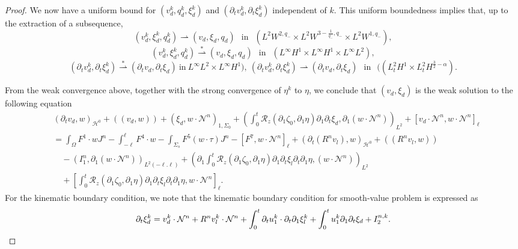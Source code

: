 \documentclass[letterpaper,reqno,10pt,twoside]{amsart}
\theoremstyle{definition}
\theoremstyle{remark}
\def\p{\partial}
\def\Om{\Omega}
\begin{document}
\begin{proof}
		We now have a uniform bound for $(v^{k}_{d},q^{k}_{d},\xi^{k}_{d})$ and $(\partial_{t}v_{d}^{k},\partial_{t}\xi_{d}^{k})$ independent of $k$. This uniform boundedness implies that, up to the extraction of a subsequence,
		\[
		(v_{d}^{k},\xi_{d}^{k},q_{d}^{k})\rightharpoonup (v_{d},\xi_{d},q_{d})~~\operatorname{in}~~(L^{2}W^{2,q_{-}}\times L^{2}W^{3-\frac{1}{q_{-}},q_{-}}\times L^{2}W^{1,q_{-}}),
		\]
		\[ (v_{d}^{k},\xi_{d}^{k},q_{d}^{k})\stackrel{\ast}\rightharpoonup (v_{d},\xi_{d},q_{d})~~\operatorname{in}~~(L^{\infty}H^{1}\times L^{\infty}H^{1}\times L^{\infty}L^{2}),
		\]
		\[
		(\partial_{t} v_{d}^{k},\partial_{t}\xi_{d}^{k})\stackrel{\ast}\rightharpoonup (\partial_{t}v_{d},\partial_{t}\xi_{d}) \ \text{in}\ L^{\infty}L^{2}\times L^{\infty}H^{1}),\  (\partial_{t} v_{d}^{k},\partial_{t}\xi_{d}^{k})\rightharpoonup (\partial_{t}v_{d},\partial_{t}\xi_{d})~~\operatorname{in}~~( (L_{t}^{2}H^{1}\times L_{t}^{2}H^{\frac{3}{2}-\alpha}).
		\]
		
		\noindent From the weak convergence above, together with the strong convergence of $\eta^{k}$ to $\eta$, we conclude that $(v_d,\xi_{d})$ is the weak solution to the following equation
		\begin{equation}\label{eq:weak_limit1}
			\begin{aligned}
				& (\p_tv_{d}, w)_{\mathcal{H}^0}+((v_{d},w))+ (\xi_{d}, w\cdot\mathcal{N}^{n})_{1,\Sigma_{0}}+(\int_{0}^{t}\mathcal{R}_{z}(\partial_{1}\zeta_{0},\partial_{1}\eta)\partial_{1}\p_{t}\xi_{d},\partial_{1}(w\cdot\mathcal{N}^{n}))_{L^{2}} + [v_{d}\cdot\mathcal{N}^{n},w\cdot\mathcal{N}^{n}]_\ell\\ &
				=\int_\Om F^1\cdot wJ^{n}-\int_{-\ell}^{\ell} F^4\cdot w-\int_{\Sigma_s}F^5(w\cdot\tau)J^{n} -[F^7,w\cdot\mathcal{N}^{n}]_\ell +(\p_{t}(R^{n}v_{l}),w)_{\mathcal{H}^{0}}+((R^{n}v_{l},w))\\
				&\quad-(I_{1}^{n},\p_{1}(w\cdot \mathcal{N}^{n}))_{L^{2}(-\ell.\ell)} +(\p_{1}\int_{0}^{t}\mathcal{R}_{z}(\partial_{1}\zeta_{0},\partial_{1}\eta)\partial_{1}\p_{t}\xi_{l}\p_{t}\p_{1}\eta,(w\cdot\mathcal{N}^{n}))_{L^{2}}\\
				&\quad+\left[\int_{0}^{t}\mathcal{R}_{z}(\partial_{1}\zeta_{0},\partial_{1}\eta)\partial_{1}\p_{t}\xi_{l}\p_{t}\p_{1}\eta,w\cdot \mathcal{N}^{n} \right]_\ell.
			\end{aligned}
		\end{equation}
		For the kinematic boundary condition, we note that the kinematic boundary condition for smooth-value problem is expressed as
		\begin{align}{\label{eq:kinematic_s}}
			\partial_{t}\xi_{d}^{k}=v_{d}^{k}\cdot \mathcal{N}^{n}+R^{n}v_{l}^{k}\cdot \mathcal{N}^{n}+\int_{0}^{t}\partial_{t}u_{1}^{k}\cdot \partial_{t}\partial_{1}\xi_{l}^{k}+\int_{0}^{t}u_1^{k}\partial_{1}\partial_{t}\xi_{d}+I^{n,k}_{2}.
		\end{align}
		

\end{proof}
\end{document}
